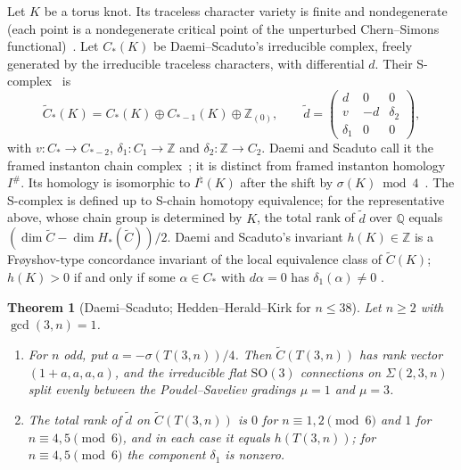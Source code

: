 \documentclass[11pt,reqno]{amsart}
\theoremstyle{plain}
\newtheorem{theorem}{Theorem}[section]
\theoremstyle{definition}
\newcommand{\Z}{\mathbb{Z}}
\newcommand{\SO}{\mathrm{SO}(3)}
\newcommand{\Inat}{I^{\natural}}
\newcommand{\Sig}{\Sigma}
\newcommand{\td}{\widetilde d}
\begin{document}
Let $K$ be a torus knot. Its traceless character variety is finite and nondegenerate (each point is a
nondegenerate critical point of the unperturbed Chern--Simons functional)~\cite[\S9.5]{DSEquiv}. Let
$C_*(K)$ be Daemi--Scaduto's irreducible complex, freely generated by the irreducible traceless
characters, with differential $d$. Their S-complex~\cite[Def.~3.21]{DSEquiv} is
\[
\widetilde C_*(K)=C_*(K)\oplus C_{*-1}(K)\oplus\Z_{(0)},\qquad
\td=\begin{pmatrix} d&0&0\\ v&-d&\delta_2\\ \delta_1&0&0\end{pmatrix},
\]
with $v\colon C_*\to C_{*-2}$, $\delta_1\colon C_1\to\Z$ and $\delta_2\colon\Z\to C_2$. Daemi and Scaduto
call it the framed instanton chain complex~\cite[\S3.4]{DSEquiv}; it is distinct from framed instanton
homology $I^\#$. Its homology is isomorphic to $\Inat(K)$ after the shift by
$\sigma(K)\bmod4$~\cite[Thm.~8.9]{DSEquiv}. The S-complex is defined up to S-chain homotopy
equivalence; for the representative above, whose chain group is determined by $K$, the total rank of
$\td$ over $\mathbb Q$ equals $(\dim\widetilde C-\dim H_*(\widetilde C))/2$. Daemi and Scaduto's invariant
$h(K)\in\Z$ is a Frøyshov-type concordance invariant of the local equivalence class of $\widetilde C(K)$;
$h(K)>0$ if and only if some $\alpha\in C_*$ with $d\alpha=0$ has $\delta_1(\alpha)\neq0$
\cite[Prop.~4.15]{DSEquiv}.

\begin{theorem}[Daemi--Scaduto; Hedden--Herald--Kirk for $n\le38$]\label{thm:C}
Let $n\ge2$ with $\gcd(3,n)=1$.
\begin{enumerate}
\item[(i)] For $n$ odd, put $a=-\sigma(T(3,n))/4$. Then $\widetilde C(T(3,n))$ has rank vector
$(1+a,a,a,a)$, and the irreducible flat $\SO$ connections on $\Sig(2,3,n)$ split evenly between the
Poudel--Saveliev gradings $\mu=1$ and $\mu=3$.
\item[(ii)] The total rank of $\td$ on $\widetilde C(T(3,n))$ is $0$ for $n\equiv1,2\pmod 6$ and $1$ for
$n\equiv4,5\pmod 6$, and in each case it equals $h(T(3,n))$; for $n\equiv4,5\pmod 6$ the component
$\delta_1$ is nonzero.
\end{enumerate}
\end{theorem}
\end{document}
